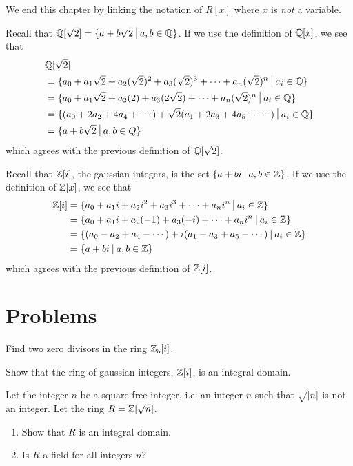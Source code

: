 We end this chapter by linking the notation of $R[x]$ where $x$ is \textit{not} a variable.
\begin{example}
    Recall that $\Q[\sqrt2] = \{a + b\sqrt2 \vert a,b \in \Q\}$. If we use the definition of $\mathbb{Q}[x]$, we see that
    \begin{align*}
        &\Q[\sqrt2] \\
        &= \{a_0 + a_1\sqrt2 + a_2(\sqrt2)^2 + a_3(\sqrt2)^3 + \cdots + a_n(\sqrt2)^n \vert a_i \in \Q \}\\
        &= \{a_0 + a_1\sqrt2 + a_2(2) + a_3(2\sqrt2) + \cdots + a_n(\sqrt2)^n \vert a_i \in \Q \}\\
        &= \{(a_0 + 2a_2 + 4a_4 + \cdots) + \sqrt2 (a_1 + 2a_3 + 4a_5 + \cdots) \vert a_i \in \Q\}\\
        &= \{a + b\sqrt2 \vert a,b \in Q\}
    \end{align*}
    which agrees with the previous definition of $\mathbb{Q}[\sqrt2]$.
\end{example}
\begin{example}
    Recall that $\mathbb{Z}[i]$, the gaussian integers, is the set $\{a+bi \vert a,b \in \Z\}$. If we use the definition of $\mathbb{Z}[x]$, we see that
    \begin{align*}
        \Z[i] &= \{a_0 + a_1i + a_2i^2 + a_3i^3 + \cdots + a_ni^n \vert a_i \in \Z\}\\
        &= \{a_0 + a_1i + a_2(-1) + a_3(-i) + \cdots + a_ni^n \vert a_i \in \Z\}\\
        &= \{(a_0 - a_2 + a_4 - \cdots) + i(a_1 - a_3 + a_5 - \cdots) \vert a_i \in \Z\}\\
        &= \{a + bi \vert a,b \in \Z\}
    \end{align*}
    which agrees with the previous definition of $\mathbb{Z}[i]$.
\end{example}

\newpage
\section{Problems}
\begin{problem}
    Find two zero divisors in the ring $\mathbb{Z}_5[i]$.
\end{problem}

\begin{problem}
    Show that the ring of gaussian integers, $\mathbb{Z}[i]$, is an integral domain.
\end{problem}

\begin{problem}
    Let the integer $n$ be a square-free integer, i.e. an integer $n$ such that $\sqrt{|n|}$ is not an integer. Let the ring $R = \mathbb{Z}[\sqrt{n}]$.
    \begin{enumerate}[label=(\alph*)]
        \item Show that $R$ is an integral domain.
        \item Is $R$ a field for all integers $n$?
    \end{enumerate}
\end{problem}

